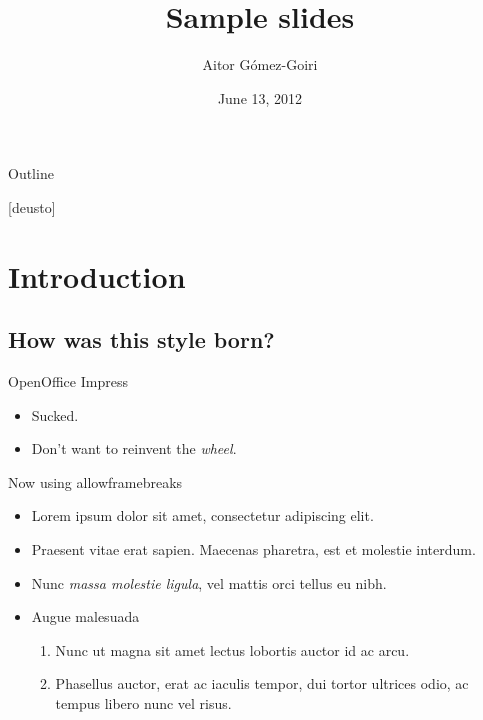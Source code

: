 \documentclass{beamer} %
\title{Sample slides}
\author{Aitor Gómez-Goiri}
\institute{DeustoTech - Deusto Institute of Technology, University of Deusto
\url{http://www.morelab.deusto.es}}
\date{June 13, 2012}
\begin{document}
  \owntitlepage

  \begin{frame}{Outline}
    \transwipe
  \end{frame}

[deusto]
\section{Introduction}
  \subsection{How was this style born?}
  \begin{frame}{OpenOffice Impress}
    \begin{itemize}
	\item Sucked.
	\pause
	\item Don't want to reinvent the \emph{wheel}.
    \end{itemize}
  \end{frame}

  \begin{frame}[allowframebreaks]{Now using allowframebreaks}
    \begin{itemize}
      \item Lorem ipsum dolor sit amet, consectetur adipiscing elit.
      \item Praesent vitae erat sapien. Maecenas pharetra, est et molestie interdum.
      \item Nunc \emph{massa molestie ligula}, vel mattis orci tellus eu nibh.
      \framebreak
      \item Augue malesuada
      \begin{enumerate}
	  \item Nunc ut magna sit amet lectus lobortis auctor id ac arcu.
	  \item Phasellus auctor, erat ac iaculis tempor, dui tortor ultrices odio, ac tempus libero nunc vel risus.
	\end{enumerate}
    \end{itemize}
  \end{frame}

\end{document}

